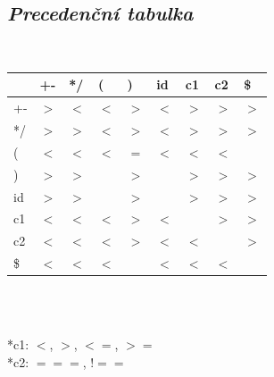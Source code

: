 \documentclass{article}
\begin{document}
\subsection{\emph{Precedenční tabulka}}
\\
\begin{center}
 \begin{tabular}{|l|l|l|l|l|l|l|l|l|}
    \hline
                & +- & */ & ( & ) & id & c1 & c2 & \$           \\
    \hline
    +- & $>$ &  $<$ &  $<$ &  $>$ &  $<$ &  $>$ &  $>$ &  $>$   \\
    \hline
    */ & $>$ &  $>$ &  $<$ &  $>$ &  $<$ &  $>$ &  $>$ &  $>$   \\
    \hline
    ( & $<$ &  $<$ &  $<$ &  $=$ &  $<$ &  $<$ &  $<$ &         \\
    \hline
    ) & $>$ &  $>$ &    &  $>$ &    &  $>$ &  $>$ &  $>$        \\
    \hline
    id & $>$ &  $>$ &    &  $>$ &    &  $>$ &  $>$ &  $>$       \\
    \hline
    c1 & $<$ &  $<$ &  $<$ &  $>$ &  $<$ &    &  $>$ &  $>$     \\
    \hline
    c2 & $<$ &  $<$ &  $<$ &  $>$ &  $<$ &  $<$ &    &  $>$     \\
    \hline
    \$ & $<$ &  $<$ &  $<$ &    &  $<$ &  $<$ &  $<$ &          \\
    \hline
 \end{tabular}\\ \\
\end{center}
*c1: $<$, $>$, $<=$, $>=$\\
*c2: $===$, $!==$\\


%
\end{document}
